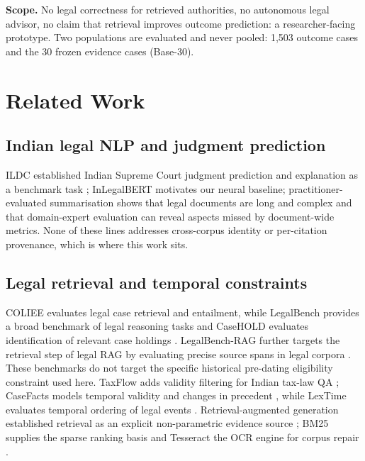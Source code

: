 \documentclass[conference]{IEEEtran}
\begin{document}
\textbf{Scope.} No legal
correctness for retrieved authorities, no autonomous legal advisor, no
claim that retrieval improves outcome prediction: a
researcher-facing prototype. Two populations are evaluated and never pooled: 1{,}503 outcome cases and the 30 frozen evidence cases (Base-30).

\section{Related Work}

\subsection{Indian legal NLP and judgment prediction}

ILDC established Indian Supreme Court judgment prediction and
explanation as a benchmark task \cite{malik2021}; InLegalBERT \cite{paul2023} motivates our neural
baseline; practitioner-evaluated summarisation \cite{shukla2022}
shows that legal documents are long and complex and that domain-expert
evaluation can reveal aspects missed by document-wide metrics. None of
these lines addresses cross-corpus identity or per-citation
provenance, which is where this work sits.

\subsection{Legal retrieval and temporal constraints}

COLIEE evaluates legal case retrieval and entailment, while
LegalBench provides a broad benchmark of legal reasoning tasks
and CaseHOLD evaluates identification of relevant case holdings
\cite{coliee2023,legalbench2023,casehold2021}. LegalBench-RAG further targets the
retrieval step of legal RAG by evaluating precise source spans in legal corpora
\cite{pipitone2024}. These benchmarks do not target the specific historical
pre-dating eligibility constraint used here.
TaxFlow adds validity filtering for Indian tax-law QA \cite{taxflow2026};
CaseFacts models temporal validity and changes in precedent \cite{casefacts2026},
while LexTime evaluates temporal ordering of legal events \cite{lextime2025}. Retrieval-augmented generation
established retrieval as an explicit non-parametric evidence source
\cite{lewis2020}; BM25 supplies the sparse ranking basis \cite{robertson2009}
and Tesseract the OCR engine for corpus repair \cite{smith2007}.
\end{document}
